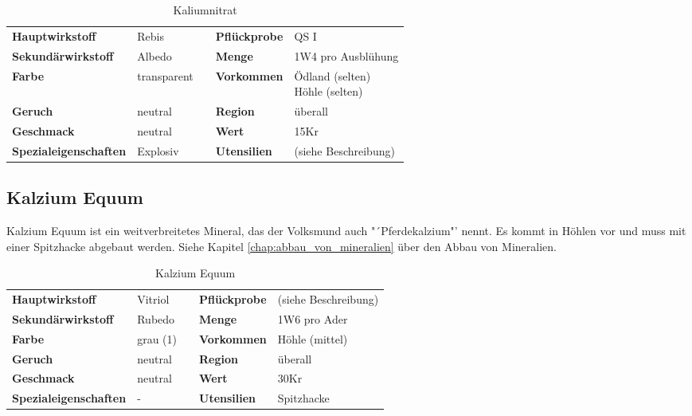 \begin{table}[H] 
\begin{center} 
\begin{tabular}{|l|l|p{1cm}|l|l|} 
  	\cline{1-2} \cline{4-5} 
  	\textbf{Hauptwirkstoff} & Rebis && \textbf{Pflückprobe} & QS I \\ \cline{1-2} \cline{4-5} 
  	\textbf{Sekundärwirkstoff} & Albedo && \textbf{Menge} & 1W4 pro Ausblühung \\ \cline{1-2} \cline{4-5} 
  	\textbf{Farbe} & transparent && \textbf{Vorkommen} & \brcell{Ödland (selten) \\ Höhle (selten)} \\ \cline{1-2} \cline{4-5} 
  	\textbf{Geruch} & neutral && \textbf{Region} & überall \\ \cline{1-2} \cline{4-5} 
  	\textbf{Geschmack} & neutral && \textbf{Wert} & 15Kr \\ \cline{1-2} \cline{4-5} 
  	\textbf{Spezialeigenschaften} & Explosiv && \textbf{Utensilien} & (siehe Beschreibung) \\ \cline{1-2} \cline{4-5} 
\end{tabular} 
\end{center} 
\caption{Kaliumnitrat} 
\label{tab:kaliumnitrat} 
\end{table}


\subsection{Kalzium Equum}
Kalzium Equum ist ein weitverbreitetes Mineral, das der Volksmund auch "´Pferdekalzium"' nennt. Es kommt in Höhlen vor und muss mit einer Spitzhacke abgebaut werden. Siehe Kapitel \ref{chap:abbau_von_mineralien} über den Abbau von Mineralien.

\begin{table}[H] 
\begin{center} 
\begin{tabular}{|l|l|p{1cm}|l|l|} 
  	\cline{1-2} \cline{4-5} 
  	\textbf{Hauptwirkstoff} & Vitriol && \textbf{Pflückprobe} & (siehe Beschreibung) \\ \cline{1-2} \cline{4-5} 
  	\textbf{Sekundärwirkstoff} & Rubedo && \textbf{Menge} & 1W6 pro Ader \\ \cline{1-2} \cline{4-5} 
  	\textbf{Farbe} & grau (1) && \textbf{Vorkommen} & Höhle (mittel) \\ \cline{1-2} \cline{4-5} 
  	\textbf{Geruch} & neutral && \textbf{Region} & überall \\ \cline{1-2} \cline{4-5} 
  	\textbf{Geschmack} & neutral && \textbf{Wert} & 30Kr \\ \cline{1-2} \cline{4-5} 
  	\textbf{Spezialeigenschaften} & - && \textbf{Utensilien} & Spitzhacke \\ \cline{1-2} \cline{4-5} 
\end{tabular} 
\end{center} 
\caption{Kalzium Equum} 
\label{tab:kalzium_equum} 
\end{table}


